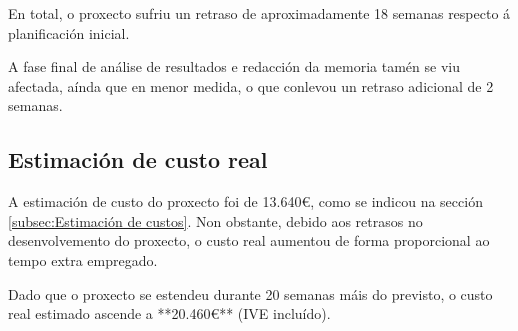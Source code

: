 En total, o proxecto sufriu un retraso de aproximadamente 18 semanas respecto á planificación inicial.

A fase final de análise de resultados e redacción da memoria tamén se viu afectada, aínda que en menor medida, o que conlevou un retraso adicional de 2 semanas.

\subsection{Estimación de custo real}
\label{subsec:Estimación de custo real}

A estimación de custo do proxecto foi de 13.640€, como se indicou na sección \ref{subsec:Estimación de custos}. Non obstante, debido aos retrasos no desenvolvemento do proxecto, o custo real aumentou de forma proporcional ao tempo extra empregado.

Dado que o proxecto se estendeu durante 20 semanas máis do previsto, o custo real estimado ascende a **20.460€**  (IVE incluído).